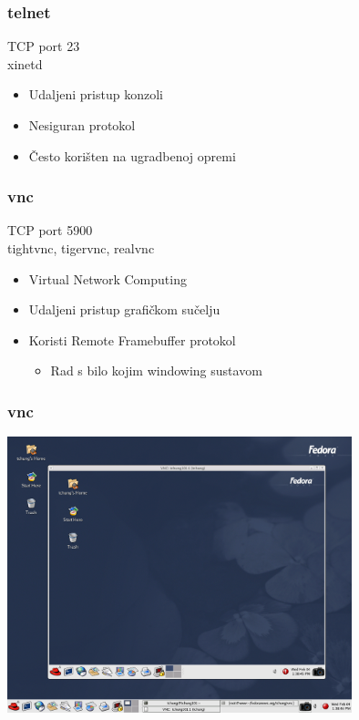 \documentclass[t,table,usenames,dvipsnames]{beamer}
\begin{document}
\begin{frame}
	\frametitle{telnet}

	TCP port 23\\
	xinetd
	
	\begin{itemize}
		\item Udaljeni pristup konzoli
		\item Nesiguran protokol
		
		\item Često korišten na ugradbenoj opremi
	\end{itemize}
\end{frame}


\begin{frame}
	\frametitle{vnc}

	TCP port 5900\\
	tightvnc, tigervnc, realvnc

	\begin{itemize}
		\item Virtual Network Computing
		\item Udaljeni pristup grafičkom sučelju
		
		\item Koristi Remote Framebuffer protokol
		\begin{itemize}
			\item Rad s bilo kojim windowing sustavom
		\end{itemize}
	\end{itemize}
\end{frame}

\begin{frame}
	\frametitle{vnc}
	\centering
	\includegraphics[width=0.75\textwidth]{vnc-desktop.png}

\end{frame}
\end{document}
